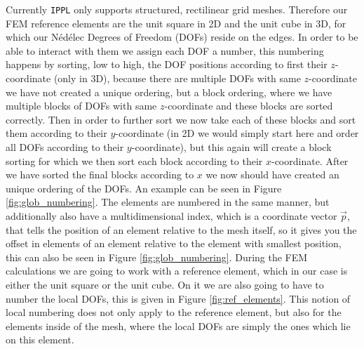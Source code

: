 Currently \texttt{IPPL} only supports structured, rectilinear grid meshes. Therefore our FEM reference elements are the unit square in 2D and the unit cube in 3D, for which our Nédélec Degrees of Freedom (DOFs) reside on the edges. In order to be able to interact with them we assign each DOF a number, this numbering happens by sorting, low to high, the DOF positions according to first their \(z\)-coordinate (only in 3D), because there are multiple DOFs with same \(z\)-coordinate we have not created a unique ordering, but a block ordering, where we have multiple blocks of DOFs with same \(z\)-coordinate and these blocks are sorted correctly. Then in order to further sort we now take each of these blocks and sort them according to their \(y\)-coordinate (in 2D we would simply start here and order all DOFs according to their \(y\)-coordinate), but this again will create a block sorting for which we then sort each block according to their \(x\)-coordinate. After we have sorted the final blocks according to \(x\) we now should have created an unique ordering of the DOFs. An example can be seen in Figure \ref{fig:glob_numbering}. The elements are numbered in the same manner, but additionally also have a multidimensional index, which is a coordinate vector \(\vec p\), that tells the position of an element relative to the mesh itself, so it gives you the offset in elements of an element relative to the element with smallest position, this can also be seen in Figure \ref{fig:glob_numbering}. During the FEM calculations we are going to work with a reference element, which in our case is either the unit square or the unit cube. On it we are also going to have to number the local DOFs, this is given in Figure \ref{fig:ref_elements}. This notion of local numbering does not only apply to the reference element, but also for the elements inside of the mesh, where the local DOFs are simply the ones which lie on this element.\medskip

